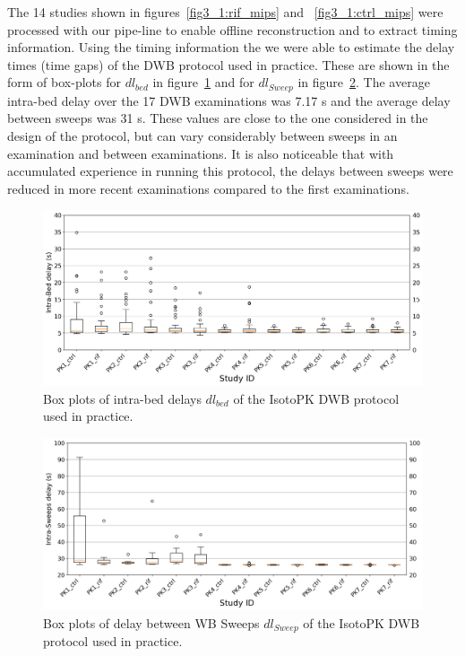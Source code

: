 The 14 studies shown in figures~\ref{fig3_1:rif_mips} and ~\ref{fig3_1:ctrl_mips} were processed with our pipe-line to enable offline reconstruction and to extract timing information. Using the timing information the we were able to estimate the delay times (time gaps) of the DWB protocol used in practice. These are shown in the form of box-plots for $dl_{bed}$ in figure~\ref{fig3_1:BoxPlots_beds} and for $dl_{Sweep}$ in figure~\ref{fig3_1:BoxPlots_sweeps}.
The average intra-bed delay over the 17 DWB examinations was 7.17 s and the average delay between sweeps was 31 s. These values are close to the one considered in the design of the protocol, but can vary considerably between sweeps in an examination and between examinations. It is also noticeable that with accumulated experience in running this protocol, the delays between sweeps were reduced in more recent examinations compared to the first examinations. \\
%
%
\begin{figure} [ht!]
\centering
\includegraphics[scale=0.5,angle=0]{3_Results/3_1_DWB_Optimization/figures/3_1_BoxPlots_DTBeds.png}
\caption{Box plots of intra-bed delays $dl_{bed}$ of the IsotoPK DWB protocol used in practice.} 
\label{fig3_1:BoxPlots_beds}
\end{figure}
%
\begin{figure} [ht!]
\centering
\includegraphics[scale=0.5,angle=0]{3_Results/3_1_DWB_Optimization/figures/3_1_BoxPlots_DTSweeps.png}
\caption{Box plots of delay between WB Sweeps $dl_{Sweep}$ of the IsotoPK DWB protocol used in practice.}
\label{fig3_1:BoxPlots_sweeps}
\end{figure}
%
%
